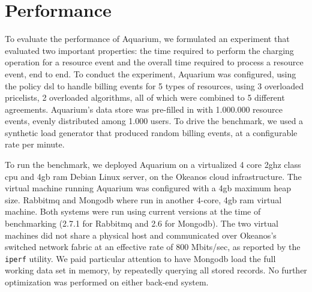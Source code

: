 \documentclass[letterpaper,twocolumn,10pt]{article}
\begin{document}
\section{Performance}

To evaluate the performance of Aquarium, we formulated an experiment
that evaluated two important properties: the time required to perform
the charging operation for a resource event and the overall time
required to process a resource event, end to end. To conduct the
experiment, Aquarium was configured, using the policy {\sc dsl} to
handle billing events for 5 types of resources, using 3 overloaded
pricelists, 2 overloaded algorithms, all of which were combined to 5
different agreements. Aquarium's data store was pre-filled in with
1.000.000 resource events, evenly distributed among 1.000 users. To
drive the benchmark, we used a synthetic load generator that produced
random billing events, at a configurable rate per minute.

To run the benchmark, we deployed Aquarium on a virtualized 4 core
2{\sc gh}z class {\sc cpu} and 4{\sc gb} {\sc ram} Debian Linux
server, on the Okeanos cloud infrastructure. The virtual machine
running Aquarium was configured with a 4{\sc gb} maximum heap size.
Rabbit{\sc mq} and Mongo{\sc db} where run in another 4-core, 4{\sc gb
  ram} virtual machine. Both systems were run using current versions
at the time of benchmarking (2.7.1 for Rabbit{\sc mq} and 2.6 for
Mongo{\sc db}). The two virtual machines did not share a physical host
and communicated over Okeanos's switched network fabric at an
effective rate of 800 Mbits/sec, as reported by the \texttt{iperf}
utility. We paid particular attention to have Mongo{\sc db} load the
full working data set in memory, by repeatedly querying all stored
records. No further optimization was performed on either back-end
system.
\end{document}
